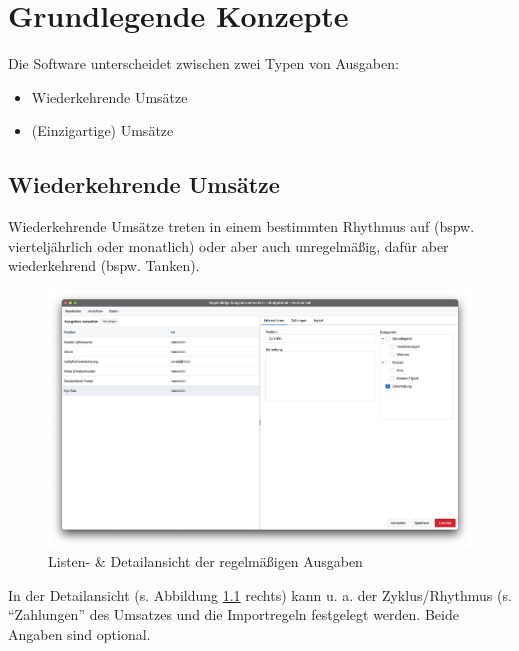 \chapter{Grundlegende Konzepte}

Die Software unterscheidet zwischen zwei Typen von Ausgaben:

\begin{itemize}[nosep]
	\item Wiederkehrende Umsätze
	\item (Einzigartige) Umsätze
\end{itemize}

\section{Wiederkehrende Umsätze} \label{sec:fixedExpenses}

Wiederkehrende Umsätze treten in einem bestimmten Rhythmus auf (bspw. vierteljährlich oder monatlich) oder aber auch unregelmäßig, dafür aber wiederkehrend (bspw. Tanken).

\begin{figure}[ht!]
	\centering
	\includegraphics[width=\textwidth]{img/Screenshot-FixedExpenses-MDV}
	\vspace{-2em}
	\caption{Listen- \& Detailansicht der regelmäßigen Ausgaben}
	\label{fig:mdvFixedExpenses}
\end{figure}

In der Detailansicht (s. Abbildung \ref{fig:mdvFixedExpenses} rechts) kann u. a. der Zyklus/Rhythmus (s. "`Zahlungen"' des Umsatzes und die Importregeln festgelegt werden. Beide Angaben sind optional.

